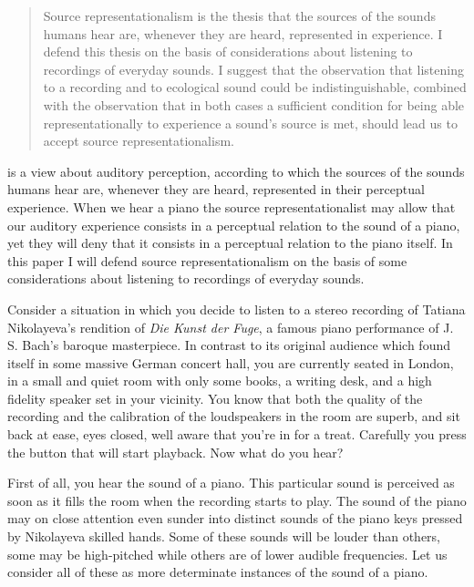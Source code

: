 \documentclass[sloppy, journal, git, bytitle, dodraft]{humapap}
\begin{document}
\documenttitle

\begin{abstract}
Source representationalism is the thesis that the sources of the sounds humans hear are, whenever they are heard, represented in experience. I defend this thesis on the basis of considerations about listening to recordings of everyday sounds. I suggest that the observation that listening to a recording and to ecological sound could be indistinguishable, combined with the observation that in both cases a sufficient condition for being able representationally to experience a sound's source is met, should lead us to accept source representationalism.
\end{abstract}	

 is a view about auditory perception, according to which the sources of the sounds humans hear are, whenever they are heard, represented in their perceptual experience. When we hear a piano the source representationalist may allow that our auditory experience consists in a perceptual relation to the sound of a piano, yet they will deny that it consists in a perceptual relation to the piano itself. In this paper I will defend source representationalism on the basis of some considerations about listening to recordings of everyday sounds.

\sect Consider a situation in which you decide to listen to a stereo recording of Tatiana Nikolayeva's rendition of \emph{Die Kunst der Fuge}, a famous piano performance of J. S. Bach's baroque masterpiece. In contrast to its original audience which found itself in some massive German concert hall, you are currently seated in London, in a small and quiet room with only some books, a writing desk, and a high fidelity speaker set in your vicinity. You know that both the quality of the recording and the calibration of the loudspeakers in the room are superb, and sit back at ease, eyes closed, well aware that you're in for a treat. Carefully you press the button that will start playback. Now what do you hear? 

\sect First of all, you hear the sound of a piano. This particular sound is perceived as soon as it fills the room when the recording starts to play. The sound of the piano may on close attention even sunder into distinct sounds of the piano keys pressed by Nikolayeva skilled hands. Some of these sounds will be louder than others, some may be high-pitched while others are of lower audible frequencies. Let us consider all of these as more determinate instances of the sound of a piano.
\end{document}
